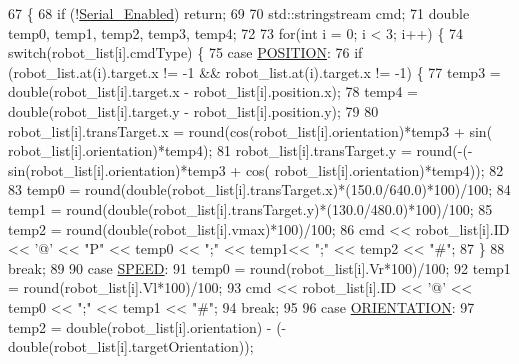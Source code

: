 \begin{DoxyCode}
67                                                          \{
68     \textcolor{keywordflow}{if} (!\hyperlink{class_serial_w_a557f72152ee772956c44fade26c1fd14}{Serial\_Enabled}) \textcolor{keywordflow}{return};
69 
70     std::stringstream cmd;
71     \textcolor{keywordtype}{double} temp0, temp1, temp2, temp3, temp4;
72 
73     \textcolor{keywordflow}{for}(\textcolor{keywordtype}{int} i = 0; i < 3; i++) \{
74         \textcolor{keywordflow}{switch}(robot\_list[i].cmdType) \{
75             \textcolor{keywordflow}{case} \hyperlink{serial_w_8hpp_a440f0e10bb28b153f5661c934bc6b89f}{POSITION}:
76                 \textcolor{keywordflow}{if} (robot\_list.at(i).target.x != -1 && robot\_list.at(i).target.x != -1) \{
77                     temp3 = double(robot\_list[i].target.x - robot\_list[i].position.x);
78                     temp4 = double(robot\_list[i].target.y - robot\_list[i].position.y);
79 
80                     robot\_list[i].transTarget.x = round(cos(robot\_list[i].orientation)*temp3 + sin(
      robot\_list[i].orientation)*temp4);
81                     robot\_list[i].transTarget.y = round(-(-sin(robot\_list[i].orientation)*temp3 + cos(
      robot\_list[i].orientation)*temp4));
82 
83                     temp0 = round(\textcolor{keywordtype}{double}(robot\_list[i].transTarget.x)*(150.0/640.0)*100)/100;
84                     temp1 = round(\textcolor{keywordtype}{double}(robot\_list[i].transTarget.y)*(130.0/480.0)*100)/100;
85                     temp2 = round(\textcolor{keywordtype}{double}(robot\_list[i].vmax)*100)/100;
86                     cmd << robot\_list[i].ID << \textcolor{charliteral}{'@'} << \textcolor{stringliteral}{"P"} << temp0 << \textcolor{stringliteral}{";"} << temp1<< \textcolor{stringliteral}{";"} << temp2 << \textcolor{stringliteral}{"#"};
87                 \}
88                 \textcolor{keywordflow}{break};
89 
90             \textcolor{keywordflow}{case} \hyperlink{serial_w_8hpp_aac3553b3932cbfeeac4526ce7ca0336b}{SPEED}:
91                 temp0 = round(robot\_list[i].Vr*100)/100;
92                 temp1 = round(robot\_list[i].Vl*100)/100;
93                 cmd << robot\_list[i].ID << \textcolor{charliteral}{'@'} << temp0 << \textcolor{stringliteral}{";"} << temp1 << \textcolor{stringliteral}{"#"};
94                 \textcolor{keywordflow}{break};
95 
96             \textcolor{keywordflow}{case} \hyperlink{serial_w_8hpp_ac815b03ec48abf99301f44140ff0b0a9}{ORIENTATION}:
97                 temp2 = double(robot\_list[i].orientation) - (- double(robot\_list[i].targetOrientation));

\end{DoxyCode}
